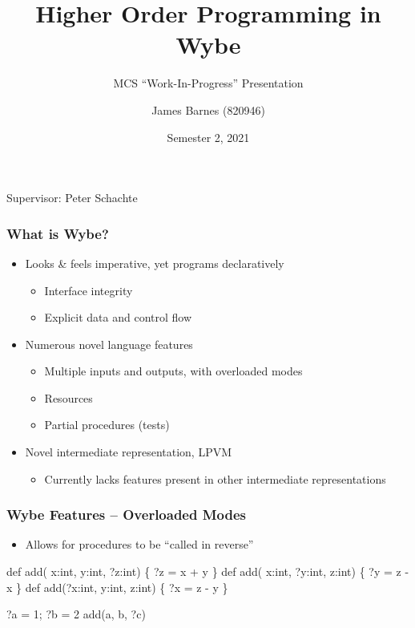 \documentclass{beamer}
\title{Higher Order Programming in Wybe}
\subtitle{MCS ``Work-In-Progress'' Presentation}
\author[James Barnes]
  {James Barnes (820946)}
\institute[unimelb]{University of Melbourne}
\date{Semester 2, 2021}
\begin{document}
\begin{frame}
  \titlepage
  \vspace{-3.5em}
  \begin{center}
    \footnotesize Supervisor: Peter Schachte
  \end{center}
\end{frame}

\begin{frame}
  \frametitle{What is Wybe?}

  \begin{itemize}
    \item Looks \& feels imperative, yet programs declaratively
    \begin{itemize}
      \item Interface integrity
      \item Explicit data and control flow
    \end{itemize}
    \item Numerous novel language features
    \begin{itemize}
      \item Multiple inputs and outputs, with overloaded modes
      \item Resources
      \item Partial procedures (tests)
    \end{itemize}
    \item Novel intermediate representation, LPVM
    \begin{itemize}
      \item Currently lacks features present in other intermediate representations
    \end{itemize}
  \end{itemize}
\end{frame}

\begin{frame}[fragile]
  \frametitle{Wybe Features -- Overloaded Modes}

  \begin{itemize}
    \item Allows for procedures to be ``called in reverse''
  \end{itemize}
  \begin{example}
    \begin{semiverbatim}
def add( x:int,  y:int, ?z:int) \{ ?z = x + y \}
def add( x:int, ?y:int,  z:int) \{ ?y = z - x \}
def add(?x:int,  y:int,  z:int) \{ ?x = z - y \}

?a = 1; ?b = 2
add(a, b, ?c)
\end{semiverbatim}
\end{example}
\end{frame}
\end{document}
